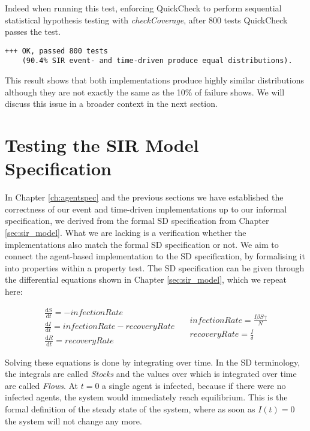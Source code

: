 Indeed when running this test, enforcing QuickCheck to perform sequential statistical hypothesis testing with \textit{checkCoverage}, after 800 tests QuickCheck passes the test.

\begin{verbatim}
+++ OK, passed 800 tests 
    (90.4% SIR event- and time-driven produce equal distributions).
\end{verbatim}

This result shows that both implementations produce highly similar distributions although they are not exactly the same as the 10\% of failure shows. We will discuss this issue in a broader context in the next section.

\section{Testing the SIR Model Specification}
\label{sec:prop_sirspecs}
In Chapter \ref{ch:agentspec} and the previous sections we have established the correctness of our event and time-driven implementations up to our informal specification, we derived from the formal SD specification from Chapter \ref{sec:sir_model}. What we are lacking is a verification whether the implementations also match the formal SD specification or not. We aim to connect the agent-based implementation to the SD specification, by formalising it into properties within a property test. The SD specification can be given through the differential equations shown in Chapter \ref{sec:sir_model}, which we repeat here:

\begin{equation}
\begin{split}
\frac{\mathrm d S}{\mathrm d t} = -infectionRate \\
\frac{\mathrm d I}{\mathrm d t} = infectionRate - recoveryRate \\
\frac{\mathrm d R}{\mathrm d t} = recoveryRate 
\end{split}
\quad
\begin{split}
infectionRate = \frac{I \beta S \gamma}{N} \\
recoveryRate = \frac{I}{\delta} 
\end{split}
\end{equation}
\label{eq:sir_delta_rates}

Solving these equations is done by integrating over time. In the SD terminology, the integrals are called \textit{Stocks} and the values over which is integrated over time are called \textit{Flows}. At $t = 0$ a single agent is infected, because if there were no infected agents, the system would immediately reach equilibrium. This is the formal definition of the steady state of the system, where as soon as $I(t) = 0$ the system will not change any more.

